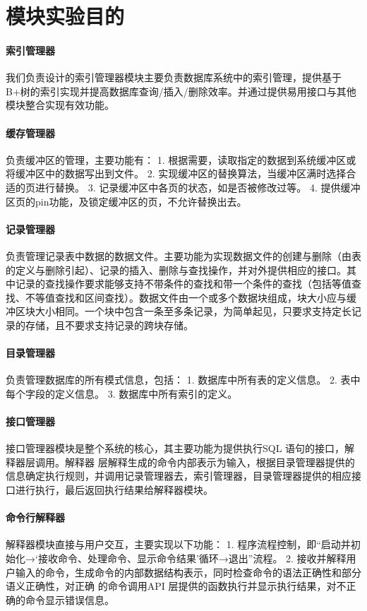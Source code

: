 \documentclass[UTF8]{ctexrep} %
\begin{document}
\section{模块实验目的}
\paragraph{索引管理器}
我们负责设计的索引管理器模块主要负责数据库系统中的索引管理，提供基于B+树的索引实现并提高数据库查询/插入/删除效率。并通过提供易用接口与其他模块整合实现有效功能。

\paragraph{缓存管理器}
负责缓冲区的管理，主要功能有：
1. 根据需要，读取指定的数据到系统缓冲区或将缓冲区中的数据写出到文件。
2. 实现缓冲区的替换算法，当缓冲区满时选择合适的页进行替换。
3. 记录缓冲区中各页的状态，如是否被修改过等。
4. 提供缓冲区页的pin功能，及锁定缓冲区的页，不允许替换出去。

\paragraph{记录管理器}
负责管理记录表中数据的数据文件。主要功能为实现数据文件的创建与删除（由表的定义与删除引起）、记录的插入、删除与查找操作，并对外提供相应的接口。其中记录的查找操作要求能够支持不带条件的查找和带一个条件的查找（包括等值查找、不等值查找和区间查找）。数据文件由一个或多个数据块组成，块大小应与缓冲区块大小相同。一个块中包含一条至多条记录，为简单起见，只要求支持定长记录的存储，且不要求支持记录的跨块存储。

\paragraph{目录管理器}
负责管理数据库的所有模式信息，包括：
1. 数据库中所有表的定义信息。
2. 表中每个字段的定义信息。
3. 数据库中所有索引的定义。

\paragraph{接口管理器}
接口管理器模块是整个系统的核心，其主要功能为提供执行SQL 语句的接口，解释器层调用。解释器 层解释生成的命令内部表示为输入，根据目录管理器提供的信息确定执行规则，并调用记录管理器去，索引管理器，目录管理器提供的相应接口进行执行，最后返回执行结果给解释器模块。

\paragraph{命令行解释器}
解释器模块直接与用户交互，主要实现以下功能：
1. 程序流程控制，即“启动并初始化→‘接收命令、处理命令、显示命令结果’循环→退出”流程。
2. 接收并解释用户输入的命令，生成命令的内部数据结构表示，同时检查命令的语法正确性和部分语义正确性，对正确
的命令调用API 层提供的函数执行并显示执行结果，对不正确的命令显示错误信息。
\end{document}
